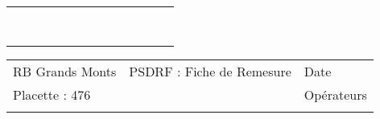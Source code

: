 \documentclass[a4paper, landscape]{article}\usepackage[]{graphicx}\usepackage[]{color}
\begin{document}
{\begin{tabular}{|p{1cm}|p{2cm}|p{1.6cm}|p{1.6cm}|p{1.6cm}|p{1.6cm}|p{1.5cm}|p{1.5cm}|p{1.5cm}|p{1.5cm}|p{1.5cm}|p{7.5cm}|p{5cm}|}
   \rowcolor[gray]{0.95} \hline
 &  &  &  &  &  &  &  &  &  &  &  &  \\ 
   \hline
 &  &  &  &  &  &  &  &  &  &  &  &  \\ 
   \rowcolor[gray]{0.95} \hline
 &  &  &  &  &  &  &  &  &  &  &  &  \\ 
   \hline
 &  &  &  &  &  &  &  &  &  &  &  &  \\ 
   \rowcolor[gray]{0.95} \hline
 &  &  &  &  &  &  &  &  &  &  &  &  \\ 
   \hline
 &  &  &  &  &  &  &  &  &  &  &  &  \\ 
   \rowcolor[gray]{0.95} \hline
 &  &  &  &  &  &  &  &  &  &  &  &  \\ 
   \hline
 &  &  &  &  &  &  &  &  &  &  &  &  \\ 
   \rowcolor[gray]{0.95} \hline
 &  &  &  &  &  &  &  &  &  &  &  &  \\ 
   \hline
\end{tabular}
}

\begin{tabular}{p{10cm}p{10cm}p{8cm}}
  RB Grands Monts & PSDRF : Fiche de Remesure & Date \\ 
  Placette : 476 &  & Opérateurs \\ 
   &  &  \\ 
  \end{tabular}
\end{document}
